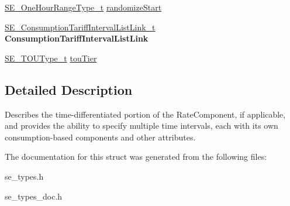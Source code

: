 \begin{DoxyCompactItemize}
\item 
\hyperlink{group__OneHourRangeType_ga2b9c57435b20a5fc0689922b77e97c2d}{S\+E\+\_\+\+One\+Hour\+Range\+Type\+\_\+t} \hyperlink{group__TimeTariffInterval_ga695517ae5552ce104273d78c0361a76f}{randomize\+Start}
\item 
\hyperlink{structSE__ConsumptionTariffIntervalListLink__t}{S\+E\+\_\+\+Consumption\+Tariff\+Interval\+List\+Link\+\_\+t} {\bfseries Consumption\+Tariff\+Interval\+List\+Link}
\item 
\hyperlink{group__TOUType_gadcfd871f87df34ae8228b9484ebedc6a}{S\+E\+\_\+\+T\+O\+U\+Type\+\_\+t} \hyperlink{group__TimeTariffInterval_gae1b2230df627613ae18186df2fc8f21d}{tou\+Tier}
\end{DoxyCompactItemize}


\subsection{Detailed Description}
Describes the time-\/differentiated portion of the Rate\+Component, if applicable, and provides the ability to specify multiple time intervals, each with its own consumption-\/based components and other attributes. 

The documentation for this struct was generated from the following files\+:\begin{DoxyCompactItemize}
\item 
se\+\_\+types.\+h\item 
se\+\_\+types\+\_\+doc.\+h\end{DoxyCompactItemize}
